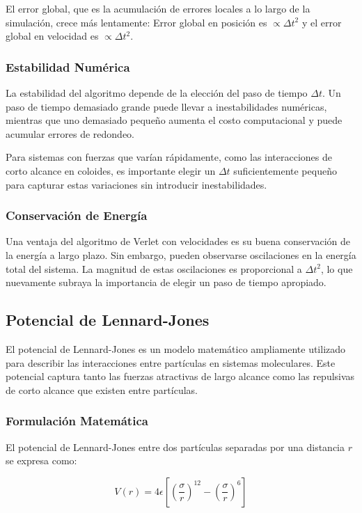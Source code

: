 \documentclass[twocolumn]{article}
\begin{document}
El error global, que es la acumulación de errores locales a lo largo de la simulación, crece más lentamente: Error global en posición es $ \propto \Delta t^2$ y el error global en velocidad es $\propto \Delta t^2$.

\subsubsection*{Estabilidad Numérica}
La estabilidad del algoritmo depende de la elección del paso de tiempo $\Delta t$. Un paso de tiempo demasiado grande puede llevar a inestabilidades numéricas, mientras que uno demasiado pequeño aumenta el costo computacional y puede acumular errores de redondeo.

Para sistemas con fuerzas que varían rápidamente, como las interacciones de corto alcance en coloides, es importante elegir un $\Delta t$ suficientemente pequeño para capturar estas variaciones sin introducir inestabilidades.

\subsubsection*{Conservación de Energía}
Una ventaja del algoritmo de Verlet con velocidades es su buena conservación de la energía a largo plazo. Sin embargo, pueden observarse oscilaciones en la energía total del sistema. La magnitud de estas oscilaciones es proporcional a $\Delta t^2$, lo que nuevamente subraya la importancia de elegir un paso de tiempo apropiado.

\subsection*{Potencial de Lennard-Jones}
El potencial de Lennard-Jones es un modelo matemático ampliamente utilizado para describir las interacciones entre partículas en sistemas moleculares. Este potencial captura tanto las fuerzas atractivas de largo alcance como las repulsivas de corto alcance que existen entre partículas.

\subsubsection*{Formulación Matemática}
El potencial de Lennard-Jones entre dos partículas separadas por una distancia $r$ se expresa como:

\begin{equation}
    V(r) = 4\epsilon \left[ \left(\frac{\sigma}{r}\right)^{12} - \left(\frac{\sigma}{r}\right)^{6} \right]
\end{equation}
\end{document}
